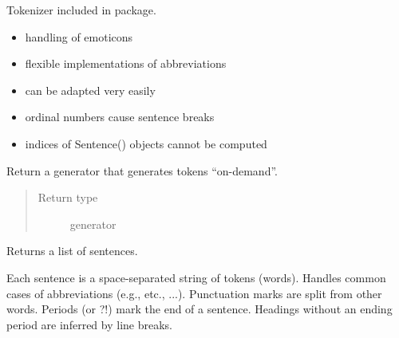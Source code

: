 \documentclass[letterpaper,10pt,english]{sphinxmanual}
\begin{document}
\begin{fulllineitems}
\label{api_reference:textblob_de.tokenizers.PatternTokenizer}
Tokenizer included in  package.
\begin{itemize}
\item {} 
handling of emoticons

\item {} 
flexible implementations of abbreviations

\item {} 
can be adapted very easily

\end{itemize}
\begin{itemize}
\item {} 
ordinal numbers cause sentence breaks

\item {} 
indices of Sentence() objects cannot be computed

\end{itemize}

\begin{fulllineitems}
\label{api_reference:textblob_de.tokenizers.PatternTokenizer.itokenize}
Return a generator that generates tokens ``on-demand''.

\begin{quote}\begin{description}
\item[{Return type}] \leavevmode
generator

\end{description}\end{quote}

\end{fulllineitems}


\begin{fulllineitems}
\label{api_reference:textblob_de.tokenizers.PatternTokenizer.sent_tokenize}
Returns a list of sentences.

Each sentence is a space-separated string of tokens (words).
Handles common cases of abbreviations (e.g., etc., ...).
Punctuation marks are split from other words. Periods (or ?!) mark the end of a sentence.
Headings without an ending period are inferred by line breaks.


\end{fulllineitems}
\end{fulllineitems}
\end{document}
